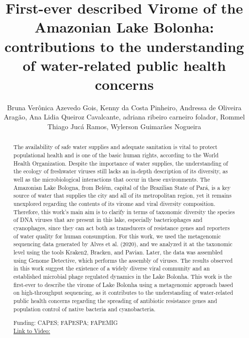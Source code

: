 \documentclass[twoside]{article}
\title{\vspace{-15mm}\fontsize{24pt}{10pt}\selectfont\textbf{ First-ever described Virome of the Amazonian Lake Bolonha: contributions to the understanding of water-related public health concerns }} %
\author{ Bruna Ver\^onica Azevedo Gois,  Kenny da Costa Pinheiro,  Andressa de Oliveira Arag\~ao,  Ana Lidia Queiroz Cavalcante,  adriana ribeiro carneiro folador,  Rommel Thiago Juc\'a Ramos,  Wylerson Guimar\~aes Nogueira }
\affil{ UFPA - UNIVERSIDADE FEDERAL DO PAR\'A/GEAM,  Universidade Federal do Par\'a -UFPA,  UNIVERSIDADE FEDERAL DE MINAS GERAIS,  UNIVERSIDADE ESTADUAL DA PARA\'IBA,  UNIVERSIDADE FEDERAL DO PAR\'A,  UNIVERSIDADE DO ESTADO DO PAR\'A }
\date{}
\begin{document}
  
  
  \maketitle %
  
  
  \thispagestyle{fancy} %
  
  
  \begin{abstract}
  The availability of safe water supplies and adequate sanitation is vital to protect populational health and is one of the basic human rights,  according to the World Health Organization. Despite the importance of water supplies,  the understanding of the ecology of freshwater viruses still lacks an in-depth description of its diversity,  as well as the microbiological interactions that occur in these environments. The Amazonian Lake Bologna,  from Bel\'em,  capital of the Brazilian State of Par\'a,  is a key source of water that supplies the city and all of its metropolitan region,  yet it remains unexplored regarding the contents of its virome and viral diversity composition. Therefore,  this work's main aim is to clarify in terms of taxonomic diversity the species of DNA viruses that are present in this lake,  especially bacteriophages and cyanophages,  since they can act both as transducers of resistance genes and reporters of water quality for human consumption. For this work,  we used the metagenomic sequencing data generated by Alves et al. (2020),  and we analyzed it at the taxonomic level using the tools Kraken2,  Bracken,  and Pavian. Later,  the data was assembled using Genome Detective,  which performs the assembly of viruses. The results observed in this work suggest the existence of a widely diverse viral community and an established microbial phage regulated dynamics in the Lake Bolonha. This work is the first-ever to describe the virome of Lake Bolonha using a metagenomic approach based on high-throughput sequencing,  as it contributes to the understanding of water-related public health concerns regarding the spreading of antibiotic resistance genes and population control of native bacteria and cyanobacteria.
  
  Funding: CAPES; FAPESPA; FAPEMIG \\
  \href{http://ab3c.org.br/xpress_pres2020/xmxp2020-307927.html}{Link to Video:}

  \end{abstract}
   
  
\end{document}
